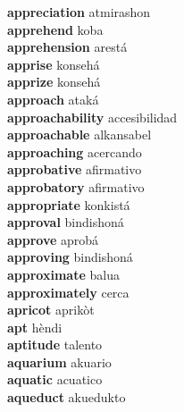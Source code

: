 \textbf{appreciation } atmirashon \\
\textbf{apprehend } koba \\
\textbf{apprehension } arestá \\
\textbf{apprise } konsehá \\
\textbf{apprize } konsehá \\
\textbf{approach } ataká \\
\textbf{approachability } accesibilidad \\
\textbf{approachable } alkansabel \\
\textbf{approaching } acercando \\
\textbf{approbative } afirmativo \\
\textbf{approbatory } afirmativo \\
\textbf{appropriate } konkistá \\
\textbf{approval } bindishoná \\
\textbf{approve } aprobá \\
\textbf{approving } bindishoná \\
\textbf{approximate } balua \\
\textbf{approximately } cerca \\
\textbf{apricot } aprikòt \\
\textbf{apt } hèndi \\
\textbf{aptitude } talento \\
\textbf{aquarium } akuario \\
\textbf{aquatic } acuatico \\
\textbf{aqueduct } akuedukto \\
